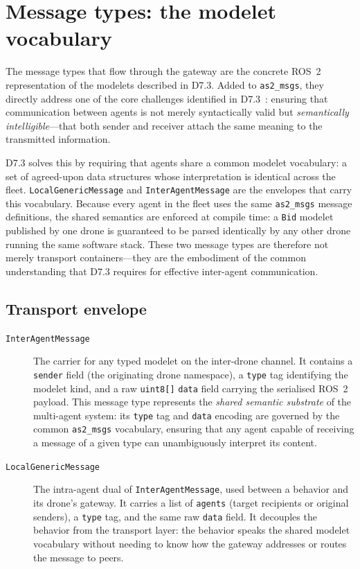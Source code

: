 \documentclass[deliverable]{csreport}
\renewcommand{\code}[1]{\texttt{\textcolor{CSMaroon}{#1}}}%
\newcommand{\tcode}[1]{\texttt{\textcolor{CSMaroon}{#1}}}
\begin{document}
\section{Message types: the modelet vocabulary}

The message types that flow through the gateway are the concrete ROS~2 representation of the modelets described in D7.3. Added to \code{as2\_msgs}, they directly address one of the core challenges identified in D7.3~\cite{CORESENSE-D73}: ensuring that communication between agents is not merely syntactically valid but \emph{semantically intelligible}---that both sender and receiver attach the same meaning to the transmitted information.

D7.3 solves this by requiring that agents share a common modelet vocabulary: a set of agreed-upon data structures whose interpretation is identical across the fleet. \code{LocalGenericMessage} and \code{InterAgentMessage} are the envelopes that carry this vocabulary. Because every agent in the fleet uses the same \code{as2\_msgs} message definitions, the shared semantics are enforced at compile time: a \code{Bid} modelet published by one drone is guaranteed to be parsed identically by any other drone running the same software stack. These two message types are therefore not merely transport containers---they are the embodiment of the common understanding that D7.3 requires for effective inter-agent communication.

\subsection{Transport envelope}

\begin{description}
  \item[\tcode{InterAgentMessage}] The carrier for any typed modelet on the inter-drone channel. It contains a \code{sender} field (the originating drone namespace), a \code{type} tag identifying the modelet kind, and a raw \code{uint8[]} \code{data} field carrying the serialised ROS~2 payload. This message type represents the \emph{shared semantic substrate} of the multi-agent system: its \code{type} tag and \code{data} encoding are governed by the common \code{as2\_msgs} vocabulary, ensuring that any agent capable of receiving a message of a given type can unambiguously interpret its content.

  \item[\tcode{LocalGenericMessage}] The intra-agent dual of \code{InterAgentMessage}, used between a behavior and its drone's gateway. It carries a list of \code{agents} (target recipients or original senders), a \code{type} tag, and the same raw \code{data} field. It decouples the behavior from the transport layer: the behavior speaks the shared modelet vocabulary without needing to know how the gateway addresses or routes the message to peers.
\end{description}
\end{document}
